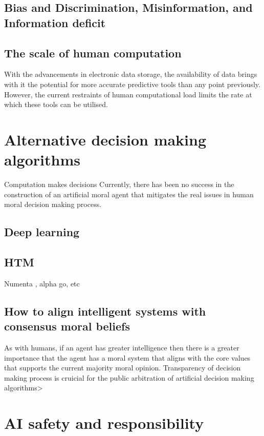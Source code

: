 \documentclass{book}
\begin{document}
\subsection{Bias and Discrimination, Misinformation, and Information deficit}

\subsection{The scale of human computation}
With the advancements in electronic data storage, the availability of data brings with it the potential for more accurate predictive tools than any point previously.
However, the current restraints of human computational load limits the rate at which these tools can be utilised.

\section{Alternative decision making algorithms}
Computation makes decisions
Currently, there has been no success in the construction of an artificial moral agent that mitigates the real issues in human moral decision making process.

\subsection{Deep learning}

\subsection{HTM}
Numenta \cite{numentahome}, alpha go, etc

\subsection{How to align intelligent systems with consensus moral beliefs}
As with humans, if an agent has greater intelligence then there is a greater importance that the agent has a moral system that aligns with the core values that supports the current majority moral opinion.
Transparency of decision making process is cruicial for the public arbitration of artificial decision making algorithms>

\section{AI safety and responsibility}
\end{document}
